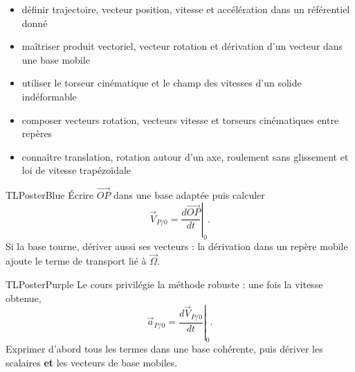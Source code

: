 \documentclass[10pt,a3paper]{article}
\begin{document}
\vspace{2mm}
\begin{minipage}[t]{0.61\linewidth}
\begin{TLPosterSavoirs}
\begin{itemize}
  \item définir trajectoire, vecteur position, vitesse et accélération dans un référentiel donné
  \item maîtriser produit vectoriel, vecteur rotation et dérivation d'un vecteur dans une base mobile
  \item utiliser le torseur cinématique et le champ des vitesses d'un solide indéformable
  \item composer vecteurs rotation, vecteurs vitesse et torseurs cinématiques entre repères
  \item connaître translation, rotation autour d'un axe, roulement sans glissement et loi de vitesse trapézoïdale
\end{itemize}
\end{TLPosterSavoirs}
\end{minipage}\hfill
\begin{minipage}[t]{0.36\linewidth}
\end{minipage}
\vfill
\begin{minipage}[t]{0.49\linewidth}
\begin{TLPosterBloc}{TLPosterBlue}
Écrire $\overrightarrow{OP}$ dans une base adaptée puis calculer
\[
\vec V_{P/0}=\left.\frac{d\overrightarrow{OP}}{dt}\right|_0.
\]
Si la base tourne, dériver aussi ses vecteurs : la dérivation dans un repère mobile ajoute le terme de transport lié à $\vec\Omega$.
\end{TLPosterBloc}
\begin{TLPosterBloc}[Accélération]{TLPosterPurple}
Le cours privilégie la méthode robuste : une fois la vitesse obtenue,
\[
\vec a_{P/0}=\left.\frac{d\vec V_{P/0}}{dt}\right|_0.
\]
Exprimer d'abord tous les termes dans une base cohérente, puis dériver les scalaires \textbf{et} les vecteurs de base mobiles.
\end{TLPosterBloc}
\end{minipage}\hfill
\end{document}
